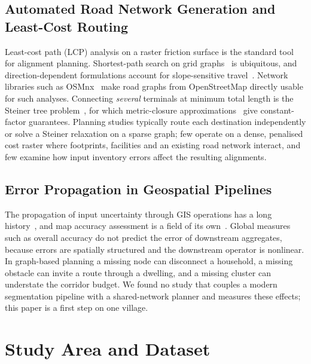 \documentclass[journal]{IEEEtran}
\begin{document}
\subsection{Automated Road Network Generation and Least-Cost Routing}
Least-cost path (LCP) analysis on a raster friction surface is the standard tool for alignment planning. Shortest-path search on grid graphs~\cite{hart1968astar} is ubiquitous, and direction-dependent formulations account for slope-sensitive travel~\cite{collischonn2000lcp}. Network libraries such as OSMnx~\cite{boeing2017osmnx,boeing2025osmnx2} make road graphs from OpenStreetMap directly usable for such analyses. Connecting \emph{several} terminals at minimum total length is the Steiner tree problem~\cite{hwang1992steiner}, for which metric-closure approximations~\cite{kou1981steiner,mehlhorn1988steiner} give constant-factor guarantees. Planning studies typically route each destination independently or solve a Steiner relaxation on a sparse graph; few operate on a dense, penalised cost raster where footprints, facilities and an existing road network interact, and few examine how input inventory errors affect the resulting alignments.

\subsection{Error Propagation in Geospatial Pipelines}
The propagation of input uncertainty through GIS operations has a long history~\cite{heuvelink1998error}, and map accuracy assessment is a field of its own~\cite{foody2002status}. Global measures such as overall accuracy do not predict the error of downstream aggregates, because errors are spatially structured and the downstream operator is nonlinear. In graph-based planning a missing node can disconnect a household, a missing obstacle can invite a route through a dwelling, and a missing cluster can understate the corridor budget. We found no study that couples a modern segmentation pipeline with a shared-network planner and measures these effects; this paper is a first step on one village.

\section{Study Area and Dataset}\label{sec:data}
\end{document}
